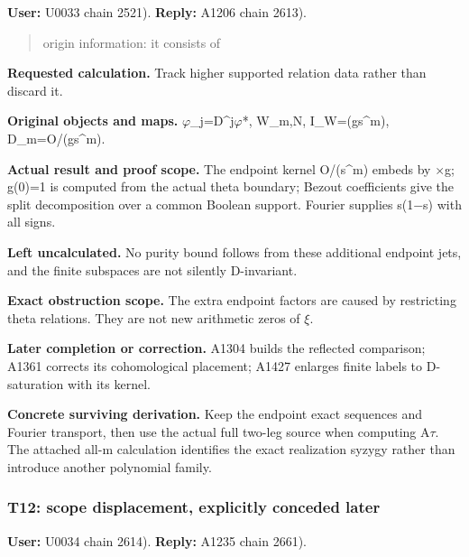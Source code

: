 \documentclass[10pt,a4paper,oneside]{report}
\begin{document}
\textbf{User:} U0033
\protect{} chain 2521).
\textbf{Reply:} A1206
\protect{} chain 2613).

\begin{quote}
origin information: it consists of
\end{quote}

\textbf{Requested calculation.} Track higher supported relation data
rather than discard it.

\textbf{Original objects and maps.}
\allowbreak{}\ensuremath{φ}\allowbreak{}\_j=D\textasciicircum{}j\allowbreak{}\ensuremath{φ}\allowbreak{}*,
W\_m,N, I\_W=(gs\^{}m), D\_m=O/(gs\^{}m).

\textbf{Actual result and proof scope.} The endpoint kernel O/(s\^{}m)
embeds by \allowbreak{}\ensuremath{×}\allowbreak{}g; g(0)=1 is computed
from the actual theta boundary; Bezout coefficients give the split
decomposition over a common Boolean support. Fourier supplies
s(1\allowbreak{}\ensuremath{−}\allowbreak{}s) with all signs.

\textbf{Left uncalculated.} No purity bound follows from these
additional endpoint jets, and the finite subspaces are not silently
D-invariant.

\textbf{Exact obstruction scope.} The extra endpoint factors are caused
by restricting theta relations. They are not new arithmetic zeros of
\allowbreak{}\ensuremath{ξ}\allowbreak{}.

\textbf{Later completion or correction.} A1304 builds the reflected
comparison; A1361 corrects its cohomological placement; A1427 enlarges
finite labels to D-saturation with its kernel.

\textbf{Concrete surviving derivation.} Keep the endpoint exact
sequences and Fourier transport, then use the actual full two-leg source
when computing A\allowbreak{}\ensuremath{τ}\allowbreak{}. The attached
all-m calculation identifies the exact realization syzygy rather than
introduce another polynomial family.

\subsubsection{T12: scope displacement, explicitly conceded
later}\label{t12-scope-displacement-explicitly-conceded-later}

\textbf{User:} U0034
\protect{} chain 2614).
\textbf{Reply:} A1235
\protect{} chain 2661).
\end{document}
